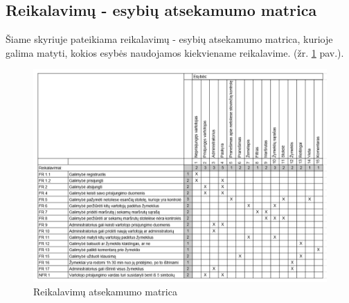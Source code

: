 \documentclass{VUMIFPSkursinis}
\begin{document}
\subsection{Reikalavimų - esybių atsekamumo matrica}
Šiame skyriuje pateikiama reikalavimų - esybių atsekamumo matrica, kurioje galima matyti, kokios esybės naudojamos kiekviename reikalavime. (žr. \ref{img:Reikalavimų matrica} pav.).
	\begin{figure}[H]
				\centering
				\includegraphics[scale=0.4]{img/esybiu_matrica}
				\caption{Reikalavimų atsekamumo matrica}
				\label{img:Reikalavimų matrica}
			\end{figure}
\end{document}
